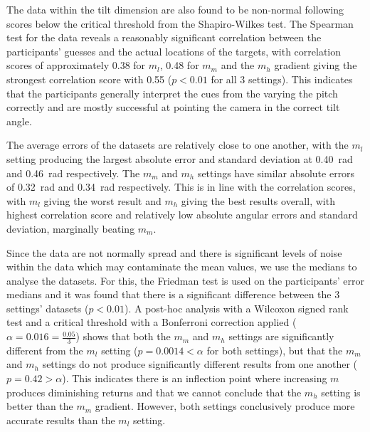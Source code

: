 \documentclass[sigconf, screen=true, anonymous=true]{acmart}
\begin{document}

The data within the tilt dimension are also found to be non-normal following scores below the critical threshold from the Shapiro-Wilkes test.
The Spearman test for the data reveals a reasonably significant correlation between the participants' guesses and the actual locations of the targets, with correlation scores of approximately 0.38 for $m_l$, 0.48 for $m_m$ and the $m_h$ gradient giving the strongest correlation score with 0.55 ($p < 0.01$ for all 3 settings).
This indicates that the participants generally interpret the cues from the varying the pitch correctly and are mostly successful at pointing the camera in the correct tilt angle.

The average errors of the datasets are relatively close to one another, with the $m_l$ setting producing the largest absolute error and standard deviation at \SI{0.40}{\radian} and \SI{0.46}{\radian} respectively.
The $m_m$ and $m_h$ settings have similar absolute errors of \SI{0.32}{\radian} and \SI{0.34}{\radian} respectively.
This is in line with the correlation scores, with $m_l$ giving the worst result and $m_h$ giving the best results overall, with highest correlation score and relatively low absolute angular errors and standard deviation, marginally beating $m_m$. 

Since the data are not normally spread and there is significant levels of noise within the data which may contaminate the mean values, we use the medians to analyse the datasets.
For this, the Friedman test is used on the participants' error medians and it was found that there is a significant difference between the 3 settings' datasets ($p < 0.01$).
A post-hoc analysis with a Wilcoxon signed rank test and a critical threshold with a Bonferroni correction applied ($\alpha=0.016=\frac{0.05}{3}$) shows that both the $m_m$ and $m_h$ settings are significantly different from the $m_l$ setting ($p=0.0014<\alpha$ for both settings), but that the $m_m$ and $m_h$ settings do not produce significantly different results from one another ($p=0.42>\alpha$).
This indicates there is an inflection point where increasing $m$ produces diminishing returns and that we cannot conclude that the $m_h$ setting is better than the $m_m$ gradient.
However, both settings conclusively produce more accurate results than the $m_l$ setting.
\end{document}
